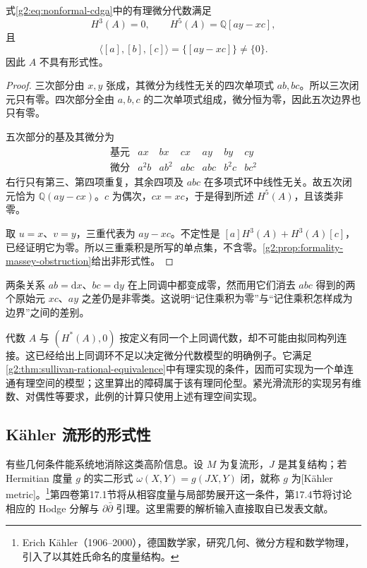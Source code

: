 \begin{proposition}\label{g2:prop:explicit-nonformal-model}
	式\eqref{g2:eq:nonformal-cdga}中的有理微分代数满足
	\[
		H^3(A)=0,\qquad H^5(A)=\mathbb Q[ay-xc],
	\]
	且
	\[
		\langle[a],[b],[c]\rangle=\{[ay-xc]\}\ne\{0\}.
	\]
	因此 \(A\) 不具有形式性。
\end{proposition}
\begin{proof}
	三次部分由 \(x,y\) 张成，其微分为线性无关的四次单项式 \(ab,bc\)。所以三次闭元只有零。四次部分全由 \(a,b,c\) 的二次单项式组成，微分恒为零，因此五次边界也只有零。

	五次部分的基及其微分为
	\[
		\begin{array}{c|rrrrrr}
			\text{基元}&ax&bx&cx&ay&by&cy\\\hline
			\text{微分}&a^2b&ab^2&abc&abc&b^2c&bc^2
		\end{array}
	\]
	右行只有第三、第四项重复，其余四项及 \(abc\) 在多项式环中线性无关。故五次闭元恰为 \(\mathbb Q(ay-cx)\)。\(c\) 为偶次，\(cx=xc\)，于是得到所述 \(H^5(A)\)，且该类非零。

	取 \(u=x\)、\(v=y\)，三重代表为 \(ay-xc\)。不定性是 \([a]H^3(A)+H^3(A)[c]\)，已经证明它为零。所以三重乘积是所写的单点集，不含零。\cref{g2:prop:formality-massey-obstruction}给出非形式性。
\end{proof}

两条关系 \(ab=\mathrm dx\)、\(bc=\mathrm dy\) 在上同调中都变成零，然而用它们消去 \(abc\) 得到的两个原始元 \(xc\)、\(ay\) 之差仍是非零类。这说明“记住乘积为零”与“记住乘积怎样成为边界”之间的差别。

\ProseParagraphBreak

代数 \(A\) 与 \((H^*(A),0)\) 按定义有同一个上同调代数，却不可能由拟同构列连接。这已经给出上同调环不足以决定微分代数模型的明确例子。它满足\cref{g2:thm:sullivan-rational-equivalence}中有理实现的条件，因而可实现为一个单连通有理空间的模型；这里算出的障碍属于该有理同伦型。紧光滑流形的实现另有维数、对偶性等要求，此例的计算只使用上述有理空间实现。

\subsection{Kähler 流形的形式性}
\label{g2:subsec:E04:05}

有些几何条件能系统地消除这类高阶信息。设 \(M\) 为复流形，\(J\) 是其复结构；若 Hermitian 度量 \(g\) 的实二形式 \(\omega(X,Y)=g(JX,Y)\) 闭，就称 \(g\) 为[Kähler metric]。\footnote{Erich Kähler（1906--2000），德国数学家，研究几何、微分方程和数学物理，引入了以其姓氏命名的度量结构。}第四卷第17.1节将从相容度量与局部势展开这一条件，第17.4节将讨论相应的 Hodge 分解与 \(\partial\bar\partial\) 引理。这里需要的解析输入直接取自已发表文献。

